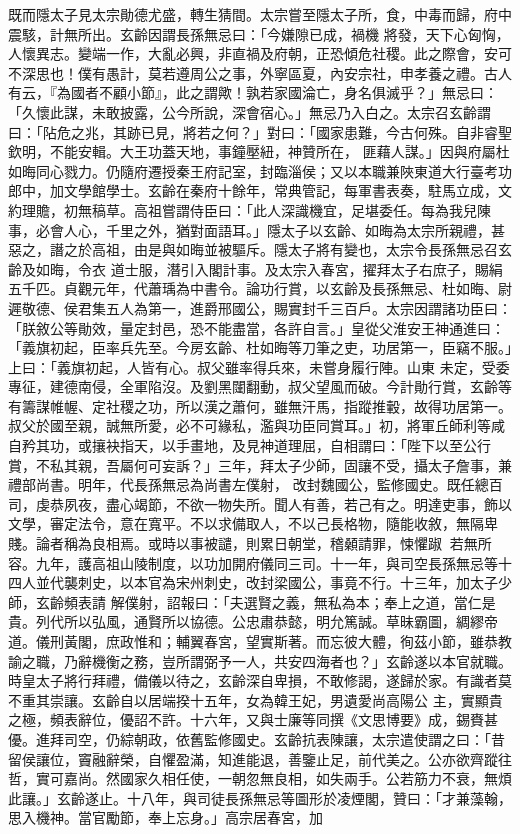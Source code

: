 \begin{pinyinscope}
 既而隱太子見太宗勛德尤盛，轉生猜間。太宗嘗至隱太子所，食，中毒而歸，府中震駭，計無所出。玄齡因謂長孫無忌曰：「今嫌隙已成，禍機
 將發，天下心匈恟，人懷異志。變端一作，大亂必興，非直禍及府朝，正恐傾危社稷。此之際會，安可不深思也！僕有愚計，莫若遵周公之事，外寧區夏，內安宗社，申孝養之禮。古人有云，『為國者不顧小節』，此之謂歟！孰若家國淪亡，身名俱滅乎？」無忌曰：「久懷此謀，未敢披露，公今所說，深會宿心。」無忌乃入白之。太宗召玄齡謂曰：「阽危之兆，其跡已見，將若之何？」對曰：「國家患難，今古何殊。自非睿聖欽明，不能安輯。大王功蓋天地，事鐘壓紐，神贊所在，
 匪藉人謀。」因與府屬杜如晦同心戮力。仍隨府遷授秦王府記室，封臨淄侯；又以本職兼陜東道大行臺考功郎中，加文學館學士。玄齡在秦府十餘年，常典管記，每軍書表奏，駐馬立成，文約理贍，初無稿草。高祖嘗謂侍臣曰：「此人深識機宜，足堪委任。每為我兒陳事，必會人心，千里之外，猶對面語耳。」隱太子以玄齡、如晦為太宗所親禮，甚惡之，譖之於高祖，由是與如晦並被驅斥。隱太子將有變也，太宗令長孫無忌召玄齡及如晦，令衣
 道士服，潛引入閣計事。及太宗入春宮，擢拜太子右庶子，賜絹五千匹。貞觀元年，代蕭瑀為中書令。論功行賞，以玄齡及長孫無忌、杜如晦、尉遲敬德、侯君集五人為第一，進爵邢國公，賜實封千三百戶。太宗因謂諸功臣曰：「朕敘公等勛效，量定封邑，恐不能盡當，各許自言。」皇從父淮安王神通進曰：「義旗初起，臣率兵先至。今房玄齡、杜如晦等刀筆之吏，功居第一，臣竊不服。」上曰：「義旗初起，人皆有心。叔父雖率得兵來，未嘗身履行陣。山東
 未定，受委專征，建德南侵，全軍陷沒。及劉黑闥翻動，叔父望風而破。今計勛行賞，玄齡等有籌謀帷幄、定社稷之功，所以漢之蕭何，雖無汗馬，指蹤推轂，故得功居第一。叔父於國至親，誠無所愛，必不可緣私，濫與功臣同賞耳。」初，將軍丘師利等咸自矜其功，或攘袂指天，以手畫地，及見神道理屈，自相謂曰：「陛下以至公行賞，不私其親，吾屬何可妄訴？」三年，拜太子少師，固讓不受，攝太子詹事，兼禮部尚書。明年，代長孫無忌為尚書左僕射，
 改封魏國公，監修國史。既任總百司，虔恭夙夜，盡心竭節，不欲一物失所。聞人有善，若己有之。明達吏事，飾以文學，審定法令，意在寬平。不以求備取人，不以己長格物，隨能收敘，無隔卑賤。論者稱為良相焉。或時以事被譴，則累日朝堂，稽顙請罪，悚懼踧，若無所容。九年，護高祖山陵制度，以功加開府儀同三司。十一年，與司空長孫無忌等十四人並代襲刺史，以本官為宋州刺史，改封梁國公，事竟不行。十三年，加太子少師，玄齡頻表請
 解僕射，詔報曰：「夫選賢之義，無私為本；奉上之道，當仁是貴。列代所以弘風，通賢所以協德。公忠肅恭懿，明允篤誠。草昧霸圖，綢繆帝道。儀刑黃閣，庶政惟和；輔翼春宮，望實斯著。而忘彼大體，徇茲小節，雖恭教諭之職，乃辭機衡之務，豈所謂弼予一人，共安四海者也？」玄齡遂以本官就職。時皇太子將行拜禮，備儀以待之，玄齡深自卑損，不敢修謁，遂歸於家。有識者莫不重其崇讓。玄齡自以居端揆十五年，女為韓王妃，男遺愛尚高陽公
 主，實顯貴之極，頻表辭位，優詔不許。十六年，又與士廉等同撰《文思博要》成，錫賚甚優。進拜司空，仍綜朝政，依舊監修國史。玄齡抗表陳讓，太宗遣使謂之曰：「昔留侯讓位，竇融辭榮，自懼盈滿，知進能退，善鑒止足，前代美之。公亦欲齊蹤往哲，實可嘉尚。然國家久相任使，一朝忽無良相，如失兩手。公若筋力不衰，無煩此讓。」玄齡遂止。十八年，與司徒長孫無忌等圖形於凌煙閣，贊曰：「才兼藻翰，思入機神。當官勵節，奉上忘身。」高宗居春宮，加

\end{pinyinscope}
